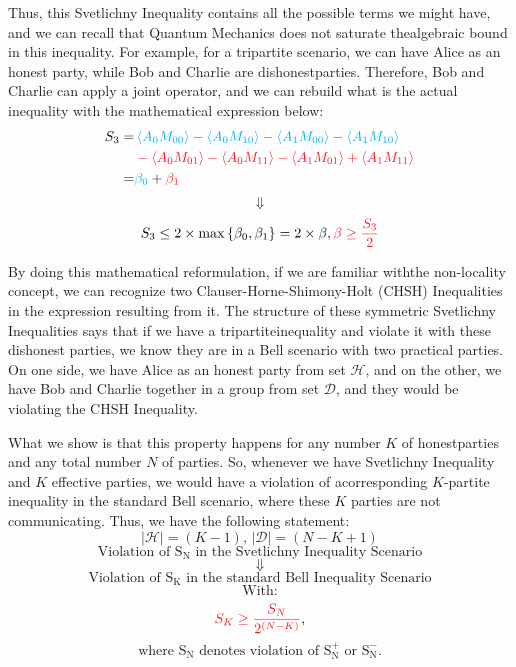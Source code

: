 \documentclass[12pt]{article}
\begin{document}
    \noindent Thus, this Svetlichny Inequality contains all the possible terms we might have, and we can recall that Quantum Mechanics does not saturate the\break algebraic bound in this inequality. For example, for a tripartite scenario, we can have Alice as an honest party, while Bob and Charlie are dishonest\break parties. Therefore, Bob and Charlie can apply a joint operator, and we can rebuild what is the actual inequality with the mathematical expression below:
    \begin{equation*}
        \begin{aligned}
            {S}_{3} = & \color{Cyan}\left\langle {A}_{0} {M}_{00} \right\rangle - \left\langle {A}_{0} {M}_{10} \right\rangle - \left\langle {A}_{1} {M}_{00} \right\rangle - \left\langle {A}_{1} {M}_{10} \right\rangle \\
            & \color{Red} - \left\langle {A}_{0} {M}_{01} \right\rangle - \left\langle {A}_{0} {M}_{11} \right\rangle - \left\langle {A}_{1} {M}_{01} \right\rangle + \left\langle {A}_{1} {M}_{11} \right\rangle \\
            = & \color{Cyan} {\beta}_{0} \color{Black} + \color{Red} {\beta}_{1}
        \end{aligned}
    \end{equation*}
    $$ \Downarrow $$
    $$ {S}_{3} \leq 2 \times \max{ \{ {\beta}_{0}, {\beta}_{1} \} } = 2 \times \beta, \color{Red} \beta \geq \frac{{S}_{3}}{2} \color{Black} $$
    
    \noindent By doing this mathematical reformulation, if we are familiar with\break the non-locality concept, we can recognize two Clauser-Horne-Shimony-Holt (CHSH) Inequalities in the expression resulting from it. The structure of these symmetric Svetlichny Inequalities says that if we have a tripartite\break inequality and violate it with these dishonest parties, we know they are in a Bell scenario with two practical parties. On one side, we have Alice as an honest party from set $\mathcal{H}$, and on the other, we have Bob and Charlie together in a group from set $\mathcal{D}$, and they would be violating the CHSH Inequality.

    \noindent What we show is that this property happens for any number $K$ of honest\break parties and any total number $N$ of parties. So, whenever we have Svetlichny Inequality and $K$ effective parties, we would have a violation of a\break corresponding $K$-partite inequality in the standard Bell scenario, where these $K$ parties are not communicating. Thus, we have the following statement:
    $$ |\mathcal{H}| = (K - 1)\mathrm{\text{, }} |\mathcal{D}| = (N - K + 1) $$
    $$ \mathrm{\text{Violation of ${S}_{N}$ in the Svetlichny Inequality Scenario}} $$
    $$ \Downarrow $$
    $$ \mathrm{\text{Violation of ${S}_{K}$ in the standard Bell Inequality Scenario}} $$
    $$ \mathrm{\text{With:}} $$
    $$ \color{Red} {S}_{K} \geq \frac{{S}_{N}}{{2}^{(N - K)}} \color{black}\mathrm{\text{,}} $$
    $$ \mathrm{\text{where ${S}_{N}$ denotes violation of ${S}_{N}^{+}$ or ${S}_{N}^{-}$.}} $$
    
\end{document}
